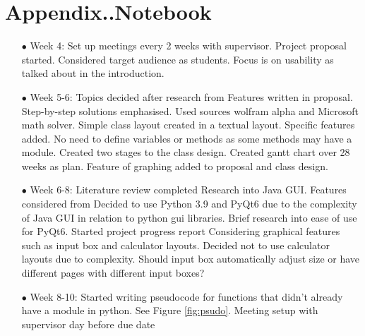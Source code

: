 \documentclass[final]{cmpreport}
\begin{document}
	\section*{Appendix..Notebook}\label{app:a}
	\begin{enumerate}
		\item[$\bullet$] Week 4: Set up meetings every 2 weeks with supervisor.
		Project proposal started. Considered target audience as students. Focus is on usability as talked about in the introduction.
		\item[$\bullet$] Week 5-6: Topics decided after research from \cite{math}
		Features written in proposal. Step-by-step solutions emphasised. Used sources wolfram alpha and Microsoft math solver.
		Simple class layout created in a textual layout. Specific features added. No need to define variables or methods as some methods may have a module.
		Created two stages to the class design.
		Created gantt chart over 28 weeks as plan.
		Feature of graphing added to proposal and class design.
		\item[$\bullet$] Week 6-8: Literature review completed
		Research into Java GUI. Features considered from 
		Decided to use Python 3.9 and PyQt6 due to the complexity of Java GUI in relation to python gui libraries. 
		Brief research into ease of use for PyQt6.\cite{pyqt}
		Started project progress report	
		Considering graphical features such as input box and calculator layouts. Decided not to use calculator layouts due to complexity. Should input box automatically adjust size or have different pages with different input boxes? 
		\item[$\bullet$] Week 8-10: Started writing pseudocode for functions that didn’t already have a module in python. See Figure \ref{fig:psudo}. Meeting setup with supervisor day before due date
		\begin{figure}[h!]
			

\end{figure}
\end{enumerate}
\end{document}
